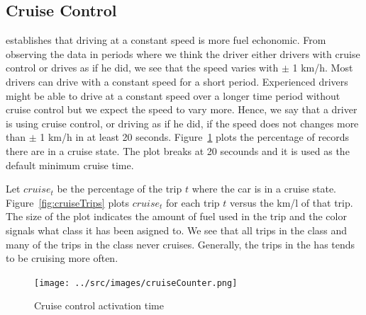 \subsection{Cruise Control}

\cite{EcoMark} establishes that driving at a constant speed is more fuel echonomic. 
From observing the data in periods where we think the driver either drivers with cruise control or drives as if he did, we see that the speed varies with $\pm$ 1 km/h.
Most drivers can drive with a constant speed for a short period. 
Experienced drivers might be able to drive at a constant speed over a longer time period without cruise control but we expect the speed to vary more. 
Hence, we say that a driver is using cruise control, or driving as if he did, if the speed does not changes more than $\pm$ 1 km/h in at least 20 seconds. Figure~\ref{fig:cruiseTripsTime} plots the percentage of records there are in a cruise state. The plot breaks at 20 secounds and it is used as the default minimum cruise time.

Let $cruise_t$ be the percentage of the trip $t$ where the car is in a cruise state.
Figure~\ref{fig:cruiseTrips} plots $cruise_t$ for each trip $t$ versus the km/l of that trip.
The size of the plot indicates the amount of fuel used in the trip and the color signals what class it has been asigned to. 
We see that all trips in the \fuelLow class and many of the trips in the \fuelMedium class never cruises.
Generally, the trips in the \fuelHigh has tends to be cruising more often.

\begin{figure}
\centering
\texttt{[image: ../src/images/cruiseCounter.png]}
\caption{Cruise control activation time}
\label{fig:cruiseTripsTime}
\end{figure}


